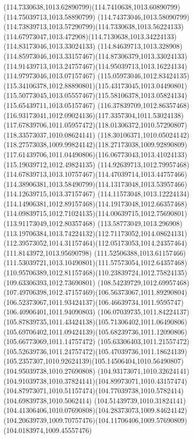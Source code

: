 {{\curveto(114.7330638,1013.62890799)(114.7410638,1013.60890799)(114.75039713,1013.58890799)
\curveto(114.74373046,1013.58090799)(114.73839713,1013.57290799)(114.7330638,1013.56224133)
\curveto(114.67973047,1013.472908)(114.7130638,1013.34224133)(114.83173046,1013.33024133)
\curveto(114.84639713,1013.328908)(114.85973046,1013.33157467)(114.87306379,1013.33024133)
\curveto(114.91439713,1013.24757467)(114.95039713,1013.16224134)(114.97973046,1013.07157467)
\curveto(115.05973046,1012.83424135)(115.34106378,1012.88890801)(115.43173045,1013.04490801)
\curveto(115.50773045,1013.05557467)(115.58106378,1013.05824134)(115.65439711,1013.05157467)
\curveto(116.37839709,1012.86357468)(116.93173041,1012.09024136)(117.3357304,1011.53024138)
\curveto(117.67839706,1011.05957472)(118.01306372,1010.57290807)(118.33573037,1010.08624141)
\curveto(118.30106371,1010.05024142)(118.27573038,1009.99824142)(118.27173038,1009.92890809)
\curveto(117.61439706,1011.04490806)(116.06773043,1013.41024133)(115.19039712,1012.49824135)
\curveto(114.92639713,1012.79957468)(114.67839713,1013.10757467)(114.47039714,1013.44757466)
\curveto(114.38906381,1013.58490799)(114.13173048,1013.53957466)(114.12639715,1013.37157467)
\curveto(114.11573048,1013.12224134)(114.14906381,1012.89157468)(114.19173048,1012.66357468)
\curveto(114.09839715,1012.71024135)(114.00639715,1012.75690801)(113.91173049,1012.80357468)
\curveto(113.58773049,1013.296908)(113.19706384,1013.74224132)(112.71173052,1014.08624131)
\curveto(112.39573052,1014.31157464)(112.05173053,1014.24357464)(111.8143972,1013.95690798)
\curveto(111.52506388,1013.61157466)(111.53039721,1013.10490801)(111.57573054,1012.64357468)
\curveto(110.95706389,1012.81157468)(110.23839724,1012.75824135)(109.63306393,1012.73690801)
\curveto(108.54239729,1012.69957468)(107.49706398,1012.47157469)(106.56373067,1011.89290804)
\curveto(106.52373067,1011.93424137)(106.46639734,1011.9595747)(106.40906401,1011.94090803)
\curveto(106.07039735,1011.84224137)(105.87839735,1011.43424138)(105.71306402,1011.06490806)
\curveto(105.69706402,1011.09424139)(105.68239736,1011.12090806)(105.66773069,1011.14757472)
\curveto(105.63306403,1011.21557472)(105.52639736,1011.24757472)(105.47039736,1011.18624139)
\curveto(105.2357307,1010.92624139)(105.14506404,1010.56490807)(104.95039738,1010.27690808)
\curveto(104.93173071,1010.32624141)(104.91039738,1010.37824141)(104.89973071,1010.43157474)
\curveto(104.87973071,1010.51157474)(104.77039738,1010.5782414)(104.69839738,1010.5062414)
\curveto(104.51439739,1010.31824141)(104.41306406,1010.07690808)(104.28373073,1009.84624142)
\curveto(104.20639739,1009.70757476)(104.11706406,1009.57690809)(104.0183974,1009.45557476)
}}
